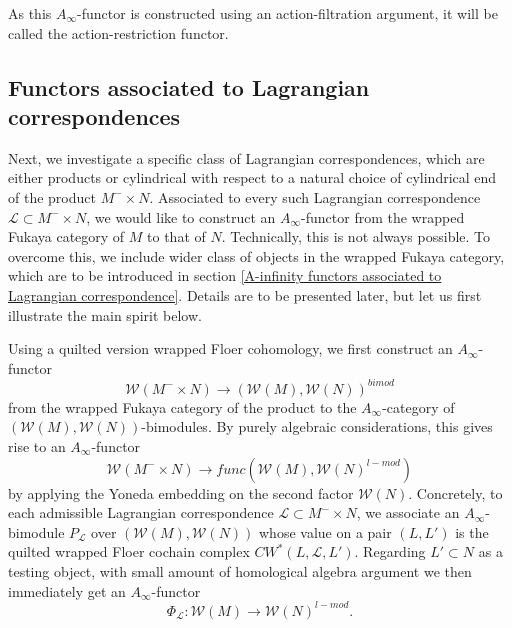 \documentclass{amsart}
\numberwithin{equation}{section}
\numberwithin{figure}{section}
\begin{document}
	As this $A_{\infty}$-functor is constructed using an action-filtration argument, it will be called the action-restriction functor. \par

\subsection{Functors associated to Lagrangian correspondences}
	Next, we investigate a specific class of Lagrangian correspondences, which are either products or cylindrical with respect to a natural choice of cylindrical end of the product $M^{-} \times N$. Associated to every such Lagrangian correspondence $\mathcal{L} \subset M^{-} \times N$, we would like to construct an $A_{\infty}$-functor from the wrapped Fukaya category of $M$ to that of $N$. Technically, this is not always possible. To overcome this, we include wider class of objects in the wrapped Fukaya category, which are to be introduced in section \ref{A-infinity functors associated to Lagrangian correspondence}. Details are to be presented later, but let us first illustrate the main spirit below. \par
	Using a quilted version wrapped Floer cohomology, we first construct an $A_{\infty}$-functor 
\begin{equation*}
\mathcal{W}(M^{-} \times N) \to (\mathcal{W}(M), \mathcal{W}(N))^{bimod}
\end{equation*}
from the wrapped Fukaya category of the product to the $A_{\infty}$-category of $(\mathcal{W}(M), \mathcal{W}(N))$-bimodules. By purely algebraic considerations, this gives rise to an $A_{\infty}$-functor
\begin{equation*}
\mathcal{W}(M^{-} \times N) \to func(\mathcal{W}(M), \mathcal{W}(N)^{l-mod})
\end{equation*}
by applying the Yoneda embedding on the second factor $\mathcal{W}(N)$. Concretely, to each admissible Lagrangian correspondence $\mathcal{L} \subset M^{-} \times N$, we associate an $A_{\infty}$-bimodule $P_{\mathcal{L}}$ over $(\mathcal{W}(M), \mathcal{W}(N))$ whose value on a pair $(L, L')$ is the quilted wrapped Floer cochain complex $CW^{*}(L, \mathcal{L}, L')$. Regarding $L' \subset N$ as a testing object, with small amount of homological algebra argument we then immediately get an $A_{\infty}$-functor
\begin{equation}
\Phi_{\mathcal{L}}: \mathcal{W}(M) \to \mathcal{W}(N)^{l-mod}.
\end{equation} \par
\end{document}
